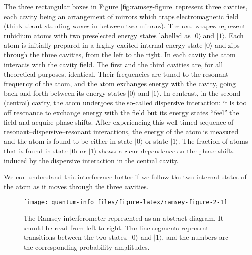 \documentclass{article}
\begin{document}
The three rectangular boxes in Figure \ref{fig:ramsey-figure} represent three cavities, each cavity being an arrangement of mirrors which traps electromagnetic field (think about standing waves in between two mirrors).
The oval shapes represent rubidium atoms with two preselected energy states labelled as \(|0\rangle\) and \(|1\rangle\).
Each atom is initially prepared in a highly excited internal energy state \(|0\rangle\) and zips through the three cavities, from the left to the right.
In each cavity the atom interacts with the cavity field.
The first and the third cavities are, for all theoretical purposes, identical.
Their frequencies are tuned to the resonant frequency of the atom, and the atom exchanges energy with the cavity, going back and forth between its energy states \(|0\rangle\) and \(|1\rangle\).
In contrast, in the second (central) cavity, the atom undergoes the so-called dispersive interaction: it is too off resonance to exchange energy with the field but its energy states ``feel'' the field and acquire phase shifts.
After experiencing this well timed sequence of resonant--dispersive--resonant interactions, the energy of the atom is measured and the atom is found to be either in state \(|0\rangle\) or state \(|1\rangle\).
The fraction of atoms that is found in state \(|0\rangle\) or \(|1\rangle\) shows a clear dependence on the phase shifts induced by the dispersive interaction in the central cavity.

We can understand this interference better if we follow the two internal states of the atom as it moves through the three cavities.



\begin{figure}[H]

{\centering \texttt{[image: quantum-info\_files/figure-latex/ramsey-figure-2-1]} 

}

\caption{The Ramsey interferometer represented as an abstract diagram. It should be read from left to right. The line segments represent transitions between the two states, \(|0\rangle\) and \(|1\rangle\), and the numbers are the corresponding probability amplitudes.}\label{fig:ramsey-figure-2}
\end{figure}
\end{document}
